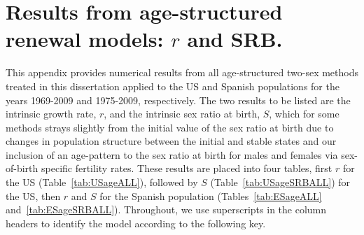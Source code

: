 
\FloatBarrier
\chapter{Results from age-structured renewal models: $r$ and SRB.}
\label{appendix:ageallrestimates}

This appendix provides numerical results from all age-structured two-sex
methods treated in this dissertation applied to the US and Spanish populations
for the years 1969-2009 and 1975-2009, respectively. The two results to be listed are the intrinsic growth
rate, $r$, and the intrinsic sex ratio at birth, $S$, which for some
methods strays slightly from the initial value of the sex ratio at birth due to
changes in population structure between the initial and stable states and our inclusion of an
age-pattern to the sex ratio at birth for males and females via sex-of-birth
specific fertility rates. These results are placed into four tables, first $r$
for the US (Table~\ref{tab:USageALL}), followed by $S$
(Table~\ref{tab:USageSRBALL}) for the US, then $r$ and $S$ for the Spanish
population (Tables~\ref{tab:ESageALL} and~\ref{tab:ESageSRBALL}). Throughout, we
use superscripts in the column headers to identify the model according to the following key.

